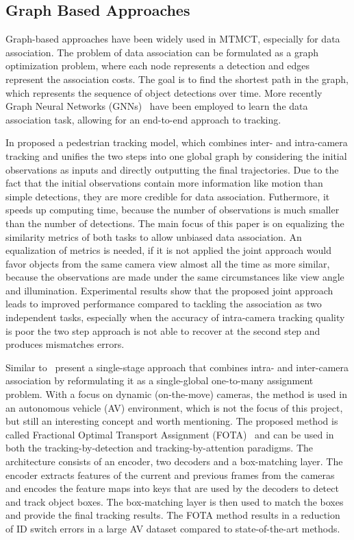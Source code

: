 \subsection{Graph Based Approaches}\label{subsec:graph_based_approaches}
Graph-based approaches have been widely used in MTMCT, especially for data association. The problem of data association can be formulated as a graph optimization problem, where each node represents a detection and edges represent the association costs. The goal is to find the shortest path in the graph, which represents the sequence of object detections over time. More recently Graph Neural Networks (GNNs)~\cite{Scarselli09} have been employed to learn the data association task, allowing for an end-to-end approach to tracking.

In \citeyear{Chen17a} \textcite{Chen17a} proposed a pedestrian tracking model, which combines inter- and intra-camera tracking and unifies the two steps into one global graph by considering the initial observations as inputs and directly outputting the final trajectories. Due to the fact that the initial observations contain more information like motion than simple detections, they are more credible for data association. Futhermore, it speeds up computing time, because the number of observations is much smaller than the number of detections. The main focus of this paper is on equalizing the similarity metrics of both tasks to allow unbiased data association. An equalization of metrics is needed, if it is not applied the joint approach would favor objects from the same camera view almost all the time as more similar, because the observations are made under the same circumstances like view angle and illumination. Experimental results show that the proposed joint approach leads to improved performance compared to tackling the association as two independent tasks, especially when the accuracy of intra-camera tracking quality is poor the two step approach is not able to recover at the second step and produces mismatches errors.

Similar to~\cite{Chen17a} \citeauthor{Nguyen22b} present a single-stage approach that combines intra- and inter-camera association by reformulating it as a single-global one-to-many assignment problem. With a focus on dynamic (on-the-move) cameras, the method is used in an autonomous vehicle (AV) environment, which is not the focus of this project, but still an interesting concept and worth mentioning. The proposed method is called Fractional Optimal Transport Assignment (FOTA)~\cite{Nguyen22b} and can be used in both the tracking-by-detection and tracking-by-attention paradigms. The architecture consists of an encoder, two decoders and a box-matching layer. The encoder extracts features of the current and previous frames from the cameras and encodes the feature maps into keys that are used by the decoders to detect and track object boxes. The box-matching layer is then used to match the boxes and provide the final tracking results. The FOTA method results in a reduction of ID switch errors in a large AV dataset compared to state-of-the-art methods.

